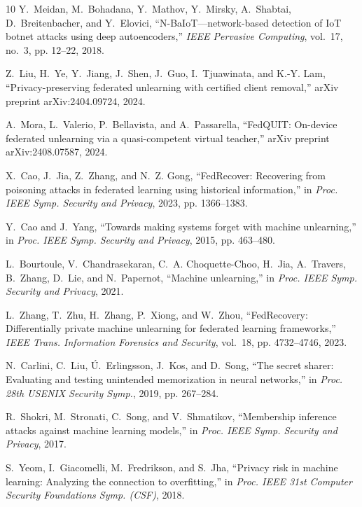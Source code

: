 \documentclass[journal]{IEEEtran}
\begin{document}
\begin{thebibliography}{10}
Y.~Meidan, M.~Bohadana, Y.~Mathov, Y.~Mirsky, A.~Shabtai, D.~Breitenbacher, and
  Y.~Elovici, ``{N-BaIoT}---network-based detection of {IoT} botnet attacks
  using deep autoencoders,'' \emph{IEEE Pervasive Computing}, vol.~17, no.~3,
  pp. 12--22, 2018.

Z.~Liu, H.~Ye, Y.~Jiang, J.~Shen, J.~Guo, I.~Tjuawinata, and K.-Y. Lam,
  ``Privacy-preserving federated unlearning with certified client removal,''
  arXiv preprint arXiv:2404.09724, 2024.

A.~Mora, L.~Valerio, P.~Bellavista, and A.~Passarella, ``{FedQUIT}: On-device
  federated unlearning via a quasi-competent virtual teacher,'' arXiv preprint
  arXiv:2408.07587, 2024.

X.~Cao, J.~Jia, Z.~Zhang, and N.~Z. Gong, ``{FedRecover}: Recovering from
  poisoning attacks in federated learning using historical information,'' in
  \emph{Proc. IEEE Symp. Security and Privacy}, 2023, pp. 1366--1383.

Y.~Cao and J.~Yang, ``Towards making systems forget with machine unlearning,''
  in \emph{Proc. IEEE Symp. Security and Privacy}, 2015, pp. 463--480.

L.~Bourtoule, V.~Chandrasekaran, C.~A. Choquette-Choo, H.~Jia, A.~Travers,
  B.~Zhang, D.~Lie, and N.~Papernot, ``Machine unlearning,'' in \emph{Proc.
  IEEE Symp. Security and Privacy}, 2021.

L.~Zhang, T.~Zhu, H.~Zhang, P.~Xiong, and W.~Zhou, ``{FedRecovery}:
  Differentially private machine unlearning for federated learning
  frameworks,'' \emph{IEEE Trans. Information Forensics and Security}, vol.~18,
  pp. 4732--4746, 2023.

N.~Carlini, C.~Liu, {\'U}.~Erlingsson, J.~Kos, and D.~Song, ``The secret
  sharer: Evaluating and testing unintended memorization in neural networks,''
  in \emph{Proc. 28th USENIX Security Symp.}, 2019, pp. 267--284.

R.~Shokri, M.~Stronati, C.~Song, and V.~Shmatikov, ``Membership inference
  attacks against machine learning models,'' in \emph{Proc. IEEE Symp. Security
  and Privacy}, 2017.

S.~Yeom, I.~Giacomelli, M.~Fredrikson, and S.~Jha, ``Privacy risk in machine
  learning: Analyzing the connection to overfitting,'' in \emph{Proc. IEEE 31st
  Computer Security Foundations Symp. (CSF)}, 2018.


\end{thebibliography}
\end{document}
